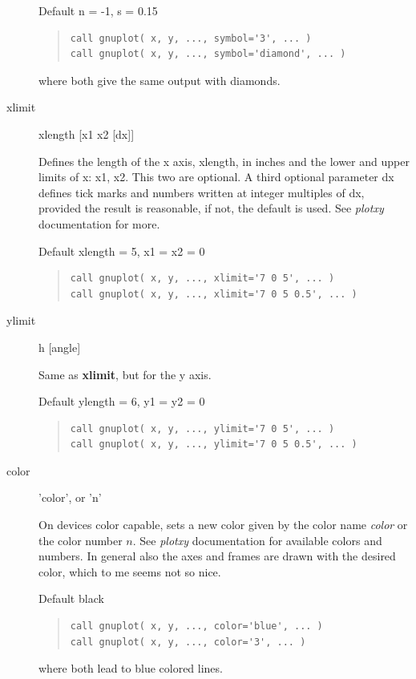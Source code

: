 \documentclass{article}
\begin{document}
\begin{description}
Default n = -1, s = 0.15
\begin{quote}
\begin{verbatim}
call gnuplot( x, y, ..., symbol='3', ... )
call gnuplot( x, y, ..., symbol='diamond', ... )
\end{verbatim}
\end{quote}
where both give the same output with diamonds. 

\item[xlimit] xlength [x1 x2 [dx]]

Defines the length of the x axis, xlength, in inches and the lower and upper limits of x: x1, x2. This two are optional. A third optional parameter dx defines tick marks and numbers written at integer multiples of dx, provided the result is reasonable, if not, the default is used. See {\it plotxy} documentation for more.

Default xlength = 5, x1 = x2 = 0

\begin{quote}
\begin{verbatim}
call gnuplot( x, y, ..., xlimit='7 0 5', ... )
call gnuplot( x, y, ..., xlimit='7 0 5 0.5', ... )
\end{verbatim}
\end{quote}

\item[ylimit] h [angle]

Same as \textbf{xlimit}, but for the y axis. 

Default ylength = 6, y1 = y2 = 0

\begin{quote}
\begin{verbatim}
call gnuplot( x, y, ..., ylimit='7 0 5', ... )
call gnuplot( x, y, ..., ylimit='7 0 5 0.5', ... )
\end{verbatim}
\end{quote}

\item[color] 'color', or 'n'

On devices color capable, sets a new color given by the color name {\it color} or the color number $n$. See {\it plotxy} documentation for available colors and numbers. In general also the axes and frames are drawn with the desired color, which to me seems not so nice. 

Default black

\begin{quote}
\begin{verbatim}
call gnuplot( x, y, ..., color='blue', ... )
call gnuplot( x, y, ..., color='3', ... )
\end{verbatim}
\end{quote}
where both lead to blue colored lines. 
\end{description}
\end{document}

